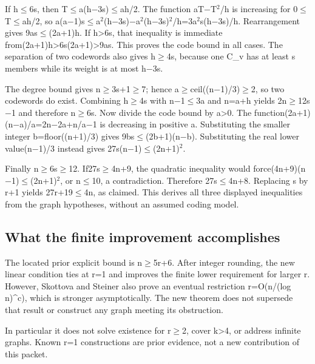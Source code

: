 \documentclass[11pt,a4paper]{article}
\begin{document}
If h\ensuremath{\leq}6s, then T\ensuremath{\leq}a(h\ensuremath{-}3s)\ensuremath{\leq}ah/2. The function aT\ensuremath{-}T\ensuremath{^2}/h is increasing for 0\ensuremath{\leq}T\ensuremath{\leq}ah/2, so a(a\ensuremath{-}1)s\ensuremath{\leq}a\ensuremath{^2}(h\ensuremath{-}3s)\ensuremath{-}a\ensuremath{^2}(h\ensuremath{-}3s)\ensuremath{^2}/h=3a\ensuremath{^2}s(h\ensuremath{-}3s)/h. Rearrangement gives 9as\ensuremath{\leq}(2a+1)h. If h>6s, that inequality is immediate from(2a+1)h>6s(2a+1)>9as. This proves the code bound in all cases. The separation of two codewords also gives h\ensuremath{\geq}4s, because one C\_v has at least s members while its weight is at most h\ensuremath{-}3s.

The degree bound gives n\ensuremath{\geq}3s+1\ensuremath{\geq}7; hence a\ensuremath{\geq}ceil((n\ensuremath{-}1)/3)\ensuremath{\geq}2, so two codewords do exist. Combining h\ensuremath{\geq}4s with n\ensuremath{-}1\ensuremath{\leq}3a and n=a+h yields 2n\ensuremath{\geq}12s\ensuremath{-}1 and therefore n\ensuremath{\geq}6s. Now divide the code bound by a>0. The function(2a+1)(n\ensuremath{-}a)/a=2n\ensuremath{-}2a+n/a\ensuremath{-}1 is decreasing in positive a. Substituting the smaller integer b=floor((n+1)/3) gives 9bs\ensuremath{\leq}(2b+1)(n\ensuremath{-}b). Substituting the real lower value(n\ensuremath{-}1)/3 instead gives 27s(n\ensuremath{-}1)\ensuremath{\leq}(2n+1)\ensuremath{^2}.

Finally n\ensuremath{\geq}6s\ensuremath{\geq}12. If27s\ensuremath{\geq}4n+9, the quadratic inequality would force(4n+9)(n\ensuremath{-}1)\ensuremath{\leq}(2n+1)\ensuremath{^2}, or n\ensuremath{\leq}10, a contradiction. Therefore 27s\ensuremath{\leq}4n+8. Replacing s by r+1 yields 27r+19\ensuremath{\leq}4n, as claimed. This derives all three displayed inequalities from the graph hypotheses, without an assumed coding model.

\subsection{What the finite improvement accomplishes}
The located prior explicit bound is n\ensuremath{\geq}5r+6. After integer rounding, the new linear condition ties at r=1 and improves the finite lower requirement for larger r. However, Skottova and Steiner also prove an eventual restriction r=O(n/(log n)\textasciicircum{}c), which is stronger asymptotically. The new theorem does not supersede that result or construct any graph meeting its obstruction.

In particular it does not solve existence for r\ensuremath{\geq}2, cover k>4, or address infinite graphs. Known r=1 constructions are prior evidence, not a new contribution of this packet.
\end{document}
